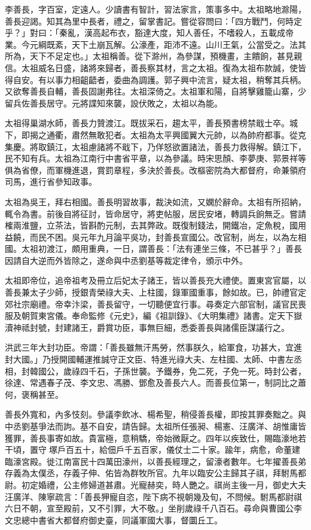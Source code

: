 

李善長，字百室，定遠人。少讀書有智計，習法家言，策事多中。太祖略地滁陽，善長迎謁。知其為里中長者，禮之，留掌書記。嘗從容問曰：「四方戰鬥，何時定乎？」對曰：「秦亂，漢高起布衣，豁達大度，知人善任，不嗜殺人，五載成帝業。今元綱既紊，天下土崩瓦解。公濠產，距沛不遠。山川王氣，公當受之。法其所為，天下不足定也。」太祖稱善。從下滁州，為參謀，預機畫，主饋餉，甚見親信。太祖威名日盛，諸將來歸者，善長察其材，言之太祖。復為太祖布款誠，使皆得自安。有以事力相齟齬者，委曲為調護。郭子興中流言，疑太祖，稍奪其兵柄。又欲奪善長自輔，善長固謝弗往。太祖深倚之。太祖軍和陽，自將擊雞籠山寨，少留兵佐善長居守。元將諜知來襲，設伏敗之，太祖以為能。

太祖得巢湖水師，善長力贊渡江。既拔采石，趨太平，善長預書榜禁戢士卒。城下，即揭之通衢，肅然無敢犯者。太祖為太平興國翼大元帥，以為帥府都事。從克集慶。將取鎮江，太祖慮諸將不戢下，乃佯怒欲置諸法，善長力救得解。鎮江下，民不知有兵。太祖為江南行中書省平章，以為參議。時宋思顏、李夢庚、郭景祥等俱為省僚，而軍機進退，賞罰章程，多決於善長。改樞密院為大都督府，命兼領府司馬，進行省參知政事。

太祖為吳王，拜右相國。善長明習故事，裁決如流，又嫻於辭命。太祖有所招納，輒令為書。前後自將征討，皆命居守，將吏帖服，居民安堵，轉調兵餉無乏。嘗請榷兩淮鹽，立茶法，皆斟酌元制，去其弊政。既復制錢法，開鐵冶，定魚稅，國用益饒，而民不困。吳元年九月論平吳功，封善長宣國公。改官制，尚左，以為左相國。太祖初渡江，頗用重典，一日，謂善長：「法有連坐三條，不已甚乎？」善長因請自大逆而外皆除之，遂命與中丞劉基等裁定律令，頒示中外。

太祖即帝位，追帝祖考及冊立后妃太子諸王，皆以善長充大禮使。置東宮官屬，以善長兼太子少師，授銀青榮祿大夫、上柱國，錄軍國重事，餘如故。已，帥禮官定郊社宗廟禮。帝幸汴梁，善長留守，一切聽便宜行事。尋奏定六部官制，議官民喪服及朝賀東宮儀。奉命監修《元史》，編《祖訓錄》、《大明集禮》諸書。定天下嶽瀆神祗封號，封建諸王，爵賞功臣，事無巨細，悉委善長與諸儒臣謀議行之。

洪武三年大封功臣。帝謂：「善長雖無汗馬勞，然事朕久，給軍食，功甚大，宜進封大國。」乃授開國輔運推誠守正文臣、特進光祿大夫、左柱國、太師、中書左丞相，封韓國公，歲祿四千石，子孫世襲。予鐵券，免二死，子免一死。時封公者，徐達、常遇春子茂、李文忠、馮勝、鄧愈及善長六人。而善長位第一，制詞比之蕭何，褒稱甚至。

善長外寬和，內多忮刻。參議李飲冰、楊希聖，稍侵善長權，即按其罪奏黜之。與中丞劉基爭法而訽。基不自安，請告歸。太祖所任張昶、楊憲、汪廣洋、胡惟庸皆獲罪，善長事寄如故。貴富極，意稍驕，帝始微厭之。四年以疾致仕，賜臨濠地若干頃，置守塚戶百五十，給佃戶千五百家，儀仗士二十家。踰年，病愈，命董建臨濠宮殿。徙江南富民十四萬田濠州，以善長經理之，留濠者數年。七年擢善長弟存義為太僕丞，存義子伸、佑皆為群牧所官。九年以臨安公主歸其子祺，拜駙馬都尉。初定婚禮，公主修婦道甚肅。光寵赫奕，時人艷之。祺尚主後一月，御史大夫汪廣洋、陳寧疏言：「善長狎寵自恣，陛下病不視朝幾及旬，不問候。駙馬都尉祺六日不朝，宣至殿前，又不引罪，大不敬。」坐削歲祿千八百石。尋命與曹國公李文忠總中書省大都督府御史臺，同議軍國大事，督圜丘工。

